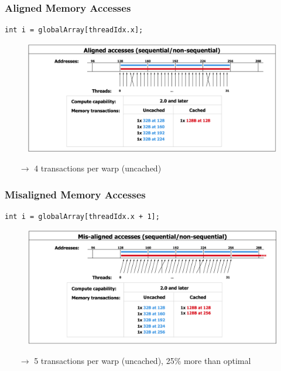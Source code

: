 \documentclass[aspectratio=169,handout]{beamer}
\begin{document}
\begin{frame}[fragile]
\frametitle{Aligned Memory Accesses}
\begin{lstlisting}
int i = globalArray[threadIdx.x];
\end{lstlisting}
		\begin{figure}
		\includegraphics[height=0.7\textheight]{coa1}
	\end{figure}
\begin{itemize}
	\item[$\rightarrow$] 4 transactions per warp (uncached)
	\end{itemize}
\end{frame}

\begin{frame}[fragile]
	\frametitle{Misaligned Memory Accesses}
\begin{lstlisting}
int i = globalArray[threadIdx.x + 1];
\end{lstlisting}
		\begin{figure}
	\includegraphics[height=0.7\textheight]{coa2}
\end{figure}
\begin{itemize}
	\item[$\rightarrow$] 5 transactions per warp (uncached), 25\% more than optimal
	\end{itemize}
\end{frame}
\end{document}
